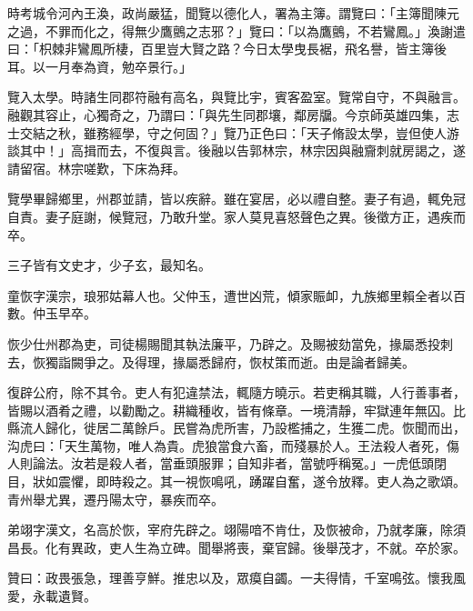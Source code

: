 \begin{pinyinscope}
時考城令河內王渙，政尚嚴猛，聞覽以德化人，署為主簿。謂覽曰：「主簿聞陳元之過，不罪而化之，得無少鷹鸇之志邪？」覽曰：「以為鷹鸇，不若鸞鳳。」渙謝遣曰：「枳棘非鸞鳳所棲，百里豈大賢之路？今日太學曳長裾，飛名譽，皆主簿後耳。以一月奉為資，勉卒景行。」

覽入太學。時諸生同郡符融有高名，與覽比宇，賓客盈室。覽常自守，不與融言。融觀其容止，心獨奇之，乃謂曰：「與先生同郡壤，鄰房牖。今京師英雄四集，志士交結之秋，雖務經學，守之何固？」覽乃正色曰：「天子脩設太學，豈但使人游談其中！」高揖而去，不復與言。後融以告郭林宗，林宗因與融齎刺就房謁之，遂請留宿。林宗嗟歎，下床為拜。

覽學畢歸鄉里，州郡並請，皆以疾辭。雖在宴居，必以禮自整。妻子有過，輒免冠自責。妻子庭謝，候覽冠，乃敢升堂。家人莫見喜怒聲色之異。後徵方正，遇疾而卒。

三子皆有文史才，少子玄，最知名。

童恢字漢宗，琅邪姑幕人也。父仲玉，遭世凶荒，傾家賑卹，九族鄉里賴全者以百數。仲玉早卒。

恢少仕州郡為吏，司徒楊賜聞其執法廉平，乃辟之。及賜被劾當免，掾屬悉投刺去，恢獨詣闕爭之。及得理，掾屬悉歸府，恢杖策而逝。由是論者歸美。

復辟公府，除不其令。吏人有犯違禁法，輒隨方曉示。若吏稱其職，人行善事者，皆賜以酒肴之禮，以勸勵之。耕織種收，皆有條章。一境清靜，牢獄連年無囚。比縣流人歸化，徙居二萬餘戶。民嘗為虎所害，乃設檻捕之，生獲二虎。恢聞而出，沟虎曰：「天生萬物，唯人為貴。虎狼當食六畜，而殘暴於人。王法殺人者死，傷人則論法。汝若是殺人者，當垂頭服罪；自知非者，當號呼稱冤。」一虎低頭閉目，狀如震懼，即時殺之。其一視恢鳴吼，踴躍自奮，遂令放釋。吏人為之歌頌。青州舉尤異，遷丹陽太守，暴疾而卒。

弟翊字漢文，名高於恢，宰府先辟之。翊陽喑不肯仕，及恢被命，乃就孝廉，除須昌長。化有異政，吏人生為立碑。聞舉將喪，棄官歸。後舉茂才，不就。卒於家。

贊曰：政畏張急，理善亨鮮。推忠以及，眾瘼自蠲。一夫得情，千室鳴弦。懷我風愛，永載遺賢。


\end{pinyinscope}